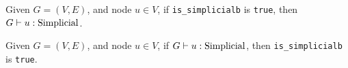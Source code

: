 
\begin{lemma}
    Given $G = (V, E)$, and node $u \in V$, if \texttt{is\_simplicialb} is \texttt{true}, then $\simplicial{u}{G}$. \Coqed
\end{lemma}

\pause

\begin{lemma}
    Given $G = (V, E)$, and node $u \in V$, if $\simplicial{u}{G}$, then \texttt{is\_simplicialb} is \texttt{true}. \Coqed
\end{lemma}
